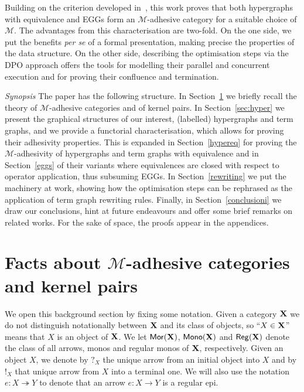 \documentclass[3p]{elsarticle}
\def\X{\textbf {\textup{X}}}
\newcommand{\mor}{\mathsf{Mor}}
\newcommand{\mon}{\mathsf{Mono}}
\newcommand{\reg}{\mathsf{Reg}}
\newcommand{\eto}{\twoheadrightarrow}
\theoremstyle{remark}
\theoremstyle{definition}
\begin{document}

Building on the criterion developed in~\cite{CastelnovoGM24}, this work proves that both hypergraphs with equivalence
and EGGs form an 
$\mathcal{M}$-adhesive category for a suitable choice of $\mathcal{M}$.
The advantages from this characterisation are two-fold. On the one side, 
we put the benefits \emph{per se} of a formal presentation, making precise the properties of the data structure. 
On the other side, describing the optimisation steps via the DPO approach
offers the tools for modelling their parallel and concurrent execution
and for proving their confluence and termination.

\emph{Synopsis}
The paper has the following structure. 
In Section~\ref{sec:ade} we briefly recall 
the theory of $\mathcal{M}$-adhesive categories
and of kernel pairs.
In Section~\ref{sec:hyper} we present the graphical structures of our interest, 
 (labelled) hypergraphs and term graphs, and we provide a
functorial characterisation, which allows for proving their adhesivity properties.
This is expanded in Section~\ref{hypereq} for proving the $\mathcal{M}$-adhesivity
of hypergraphs 
and term graphs with equivalence and in Section~\ref{eggs} of
their variants where equivalences are closed with respect to operator application,
thus subsuming EGGs.
%
In Section~\ref{rewriting} we put the machinery at work, showing how the optimisation steps
can be rephrased as the application of term graph rewriting rules.
%
Finally, in Section~\ref{conclusioni} we draw our conclusions, hint at future endeavours and offer some 
brief remarks on related works.
%
For the sake of space, the proofs appear in the appendices. 


\section{Facts about $\mathcal{M}$-adhesive categories and kernel pairs}\label{sec:ade}

We open this background section by fixing some notation. Given a category $\X$ we do not distinguish notationally between $\X$ and its class of objects, so
``$X\in \X$'' means that $X$ is an object of $\X$. We let $\mor(\X)$, $\mon(\X)$ and $\reg(\X)$ denote the class of all arrows, monos and regular monos of $\X$, respectively.  Given an object $X$, we  denote by $?_X$ the unique arrow from an initial object into $X$ and by $!_X$ that  unique arrow from $X$ into a terminal one. We will also use the notation $e\colon X\eto Y$ to denote that an arrow $e\colon X\to Y$ is a regular epi. 
\end{document}

